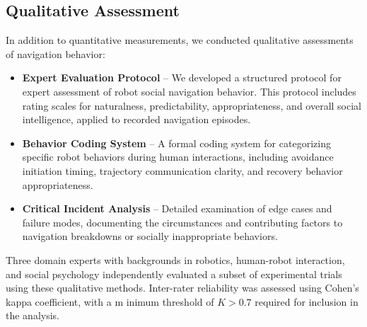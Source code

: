 
\subsection{Qualitative Assessment}
\label{subsec:qualitative_assessment}
In addition to quantitative measurements, we conducted qualitative assessments of navigation 
behavior:
\begin{itemize}
    \item \textbf{Expert Evaluation Protocol} -- We developed a structured protocol for 
    expert assessment of robot social navigation behavior. This protocol includes rating 
    scales for naturalness, predictability, appropriateness, and overall social intelligence, 
    applied to recorded navigation episodes.
    \item \textbf{Behavior Coding System} -- A formal coding system for categorizing specific 
    robot behaviors during human interactions, including avoidance initiation timing, trajectory 
    communication clarity, and recovery behavior appropriateness.
    \item \textbf{Critical Incident Analysis} -- Detailed examination of edge cases and failure 
    modes, documenting the circumstances and contributing factors to navigation breakdowns or 
    socially inappropriate behaviors.
\end{itemize}
Three domain experts with backgrounds in robotics, human-robot interaction, and social 
psychology independently evaluated a subset of experimental trials using these qualitative 
methods. Inter-rater reliability was assessed using Cohen's kappa coefficient, with a m
inimum threshold of $K > 0.7$ required for inclusion in the analysis.

